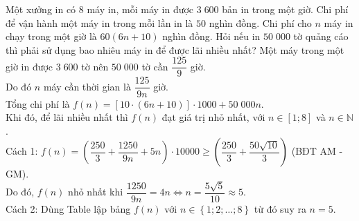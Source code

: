 \begin{bt}%

	Một xưởng in có $8$ máy in, mỗi máy in được $3\;600$ bản in trong một giờ. Chi phí để vận hành một máy in trong mỗi lần in là $50$ nghìn đồng. Chi phí cho $n$ máy in chạy trong một giờ là $60(6n+10)$ nghìn đồng. Hỏi nếu in $50\;000$ tờ quảng cáo thì phải sử dụng bao nhiêu máy in để được lãi nhiều nhất?	
	\loigiai
	{Một máy trong một giờ in được $3\;600$ tờ nên $50\;000$ tờ cần $\dfrac{125}{9}$ giờ.\\
		Do đó $n$ máy cần thời gian là $\dfrac{125}{9n}$ giờ.\\
		Tổng chi phí là $f(n)=\left[10\cdot \left(6n+10\right)\right]\cdot 1000+50\;000n$.\\
		Khi đó, để lãi nhiều nhất thì $f(n)$ đạt giá trị nhỏ nhất, với $n\in \left[1;8\right]$ và $n\in \mathbb{N}$.\\
		Cách 1: $f(n)=\left(\dfrac{250}{3}+\dfrac{1250}{9n}+5n\right)\cdot 10000\geq \left(\dfrac{250}{3}+\dfrac{50\sqrt{10}}{3}\right)$ (BĐT AM - GM).\\
		Do đó, $f(n)$ nhỏ nhất khi $\dfrac{1250}{9n}=4n\Leftrightarrow n =\dfrac{5\sqrt{5}}{10}\approx 5$.\\
		Cách 2: Dùng Table lập bảng $f(n)$ với $n\in \left\{1; 2; \ldots ; 8\right\}$ từ đó suy ra $n=5$.  
	}
\end{bt}

